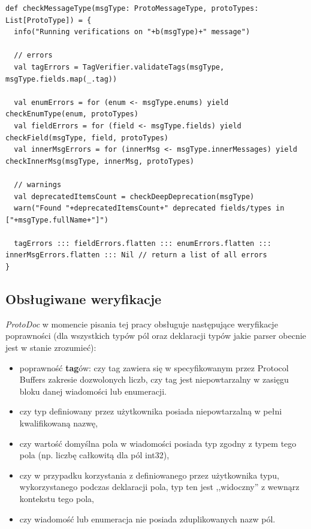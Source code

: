 \documentclass[pdflatex,11pt]{aghdpl}
\begin{document}
\begin{lstlisting}[caption={Metoda checkMessageType, sprawdzająca poprawność wiadomości}, label={lst:checkMessageType}]
def checkMessageType(msgType: ProtoMessageType, protoTypes: List[ProtoType]) = {
  info("Running verifications on "+b(msgType)+" message")

  // errors 
  val tagErrors = TagVerifier.validateTags(msgType, msgType.fields.map(_.tag))

  val enumErrors = for (enum <- msgType.enums) yield checkEnumType(enum, protoTypes)
  val fieldErrors = for (field <- msgType.fields) yield checkField(msgType, field, protoTypes)
  val innerMsgErrors = for (innerMsg <- msgType.innerMessages) yield checkInnerMsg(msgType, innerMsg, protoTypes)

  // warnings 
  val deprecatedItemsCount = checkDeepDeprecation(msgType)
  warn("Found "+deprecatedItemsCount+" deprecated fields/types in ["+msgType.fullName+"]")

  tagErrors ::: fieldErrors.flatten ::: enumErrors.flatten ::: innerMsgErrors.flatten ::: Nil // return a list of all errors
}
\end{lstlisting}


\subsection{Obsługiwane weryfikacje}
\textit{ProtoDoc} w momencie pisania tej pracy obsługuje następujące weryfikacje poprawności (dla wszystkich typów pól oraz deklaracji typów jakie parser obecnie 
jest w stanie zrozumieć):

\begin{itemize}
 \item poprawność \textbf{tag}ów: 
  \subitem czy tag zawiera się w specyfikowanym przez Protocol Buffers zakresie dozwolonych liczb, 
  \subitem czy tag jest niepowtarzalny w zasięgu bloku danej wiadomości lub enumeracji.
 \item czy typ definiowany przez użytkownika posiada niepowtarzalną w pełni kwalifikowaną nazwę, 
 \item czy wartość domyślna pola w wiadomości posiada typ zgodny z typem tego pola (np. liczbę całkowitą dla pól int32), 
 \item czy w przypadku korzystania z definiowanego przez użytkownika typu, wykorzystanego podczas deklaracji pola, typ ten jest ,,widoczny'' 
       z wewnąrz kontekstu tego pola, 
 \item czy wiadomość lub enumeracja nie posiada zduplikowanych nazw pól.
\end{itemize}
\end{document}
